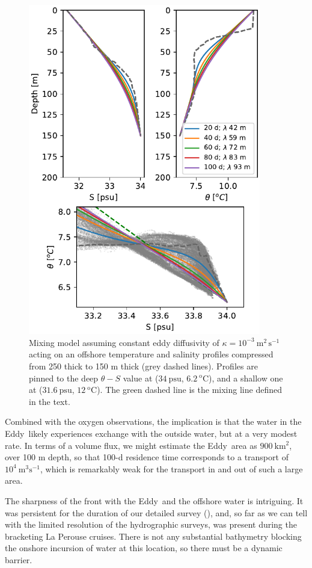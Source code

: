 \documentclass[draft]{agujournal2019}
\newcommand*{\Eddy}{{\sc Eddy}}
\begin{document}
\begin{figure}[htbp]
  \begin{center}
    \includegraphics[width=4in]{TSExercise}
    \caption{Mixing model assuming constant eddy diffusivity of $\kappa = 10^{-3}\ \mathrm{m^2\,s^{-1}}$ acting on an offshore temperature and salinity profiles compressed from 250 thick to 150 m thick (grey dashed lines).  Profiles are pinned to the deep $\theta-S$ value at ($34\ \mathrm{psu}$, $6.2\ \mathrm{^oC}$), and a shallow one at ($31.6\ \mathrm{psu}$, $12\ \mathrm{^oC}$).  The green dashed line is the mixing line defined in the text.
      \label{fig:TSExercise} }
  \end{center}
\end{figure}

Combined with the oxygen observations, the implication is that the water in the \Eddy\ likely experiences exchange with the outside water, but at a very modest rate.  In terms of a volume flux, we might estimate the \Eddy\ area as $900\ \mathrm{km^2}$, over 100 m depth, so that 100-d residence time corresponds to a transport of $10^{4}\ \mathrm{m^3s^{-1}}$, which is remarkably weak for the transport in and out of such a large area.

The sharpness of the front with the \Eddy\ and the offshore water is
intriguing.  It was persistent for the duration of our detailed survey
(), and, so far as we can tell with the limited resolution
of the hydrographic surveys, was present during the bracketing La Perouse
cruises. There is not any substantial bathymetry blocking the onshore incursion
of water at this location, so there must be a dynamic barrier.
\end{document}
